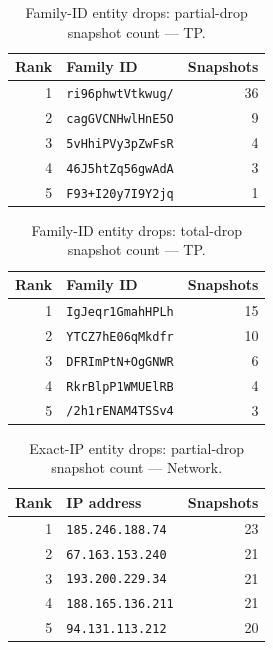 \documentclass[conference]{IEEEtran}
\begin{document}
\begin{table}[H]
\caption{Family-ID entity drops: partial-drop snapshot count --- TP.}
\begin{center}\small
\begin{tabular}{|r|l|r|}
\hline
\textbf{Rank} & \textbf{Family ID} & \textbf{Snapshots} \\ \hline
1 & \texttt{ri96phwtVtkwug/} & 36 \\ \hline
2 & \texttt{cagGVCNHwlHnE5O} & 9 \\ \hline
3 & \texttt{5vHhiPVy3pZwFsR} & 4 \\ \hline
4 & \texttt{46J5htZq56gwAdA} & 3 \\ \hline
5 & \texttt{F93+I20y7I9Y2jq} & 1 \\ \hline
\end{tabular}
\label{tab:famdrop_partial_third_party_probe}
\end{center}\end{table}
 
\begin{table}[H]
\caption{Family-ID entity drops: total-drop snapshot count --- TP.}
\begin{center}\small
\begin{tabular}{|r|l|r|}
\hline
\textbf{Rank} & \textbf{Family ID} & \textbf{Snapshots} \\ \hline
1 & \texttt{IgJeqr1GmahHPLh} & 15 \\ \hline
2 & \texttt{YTCZ7hE06qMkdfr} & 10 \\ \hline
3 & \texttt{DFRImPtN+OgGNWR} & 6 \\ \hline
4 & \texttt{RkrBlpP1WMUElRB} & 4 \\ \hline
5 & \texttt{/2h1rENAM4TSSv4} & 3 \\ \hline
\end{tabular}
\label{tab:famdrop_total_third_party_probe}
\end{center}\end{table}
 
\begin{table}[H]
\caption{Exact-IP entity drops: partial-drop snapshot count --- Network.}
\begin{center}\small
\begin{tabular}{|r|l|r|}
\hline
\textbf{Rank} & \textbf{IP address} & \textbf{Snapshots} \\ \hline
1 & \texttt{185.246.188.74} & 23 \\ \hline
2 & \texttt{67.163.153.240} & 21 \\ \hline
3 & \texttt{193.200.229.34} & 21 \\ \hline
4 & \texttt{188.165.136.211} & 21 \\ \hline
5 & \texttt{94.131.113.212} & 20 \\ \hline
\end{tabular}
\label{tab:ipdrop_partial_network}
\end{center}\end{table}
 
\end{document}
